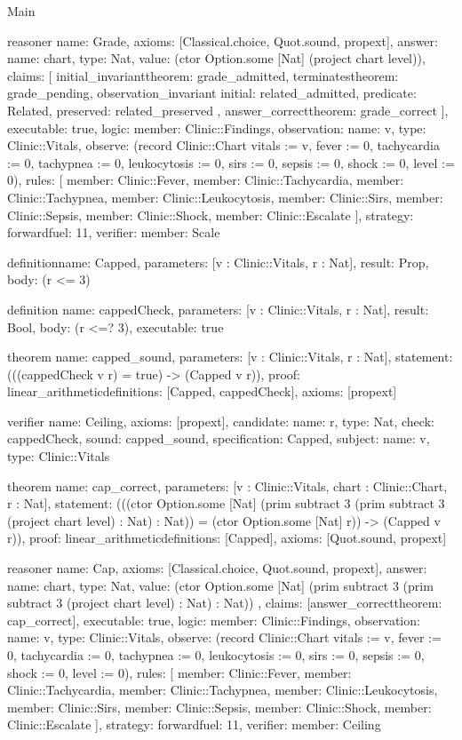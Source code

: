 \begin{lexlean}{Main}
\begin{semanticmodule}
reasoner{
  name: Grade,
  axioms: [Classical.choice, Quot.sound, propext],
  answer: {name: chart, type: Nat, value: (ctor Option.some [Nat] (project chart level))},
  claims: [
    initial_invariant{theorem: grade_admitted},
    terminates{theorem: grade_pending},
    observation_invariant{
      initial: related_admitted,
      predicate: Related,
      preserved: related_preserved
    },
    answer_correct{theorem: grade_correct}
  ],
  executable: true,
  logic: {member: Clinic::Findings},
  observation: {name: v, type: Clinic::Vitals},
  observe: (record Clinic::Chart {vitals := v, fever := 0, tachycardia := 0, tachypnea := 0, leukocytosis := 0, sirs := 0, sepsis := 0, shock := 0, level := 0}),
  rules: [
    {member: Clinic::Fever},
    {member: Clinic::Tachycardia},
    {member: Clinic::Tachypnea},
    {member: Clinic::Leukocytosis},
    {member: Clinic::Sirs},
    {member: Clinic::Sepsis},
    {member: Clinic::Shock},
    {member: Clinic::Escalate}
  ],
  strategy: forward{fuel: 11},
  verifier: {member: Scale}
}

definition{name: Capped, parameters: [v : Clinic::Vitals, r : Nat], result: Prop, body: (r <= 3)}

definition{
  name: cappedCheck,
  parameters: [v : Clinic::Vitals, r : Nat],
  result: Bool,
  body: (r <=? 3),
  executable: true
}

theorem{
  name: capped_sound,
  parameters: [v : Clinic::Vitals, r : Nat],
  statement: (((cappedCheck v r) = true) -> (Capped v r)),
  proof: linear_arithmetic{definitions: [Capped, cappedCheck]},
  axioms: [propext]
}

verifier{
  name: Ceiling,
  axioms: [propext],
  candidate: {name: r, type: Nat},
  check: cappedCheck,
  sound: capped_sound,
  specification: Capped,
  subject: {name: v, type: Clinic::Vitals}
}

theorem{
  name: cap_correct,
  parameters: [v : Clinic::Vitals, chart : Clinic::Chart, r : Nat],
  statement: (((ctor Option.some [Nat] (prim subtract 3 (prim subtract 3 (project chart level) : Nat) : Nat)) = (ctor Option.some [Nat] r)) -> (Capped v r)),
  proof: linear_arithmetic{definitions: [Capped]},
  axioms: [Quot.sound, propext]
}

reasoner{
  name: Cap,
  axioms: [Classical.choice, Quot.sound, propext],
  answer: {
    name: chart,
    type: Nat,
    value: (ctor Option.some [Nat] (prim subtract 3 (prim subtract 3 (project chart level) : Nat) : Nat))
  },
  claims: [answer_correct{theorem: cap_correct}],
  executable: true,
  logic: {member: Clinic::Findings},
  observation: {name: v, type: Clinic::Vitals},
  observe: (record Clinic::Chart {vitals := v, fever := 0, tachycardia := 0, tachypnea := 0, leukocytosis := 0, sirs := 0, sepsis := 0, shock := 0, level := 0}),
  rules: [
    {member: Clinic::Fever},
    {member: Clinic::Tachycardia},
    {member: Clinic::Tachypnea},
    {member: Clinic::Leukocytosis},
    {member: Clinic::Sirs},
    {member: Clinic::Sepsis},
    {member: Clinic::Shock},
    {member: Clinic::Escalate}
  ],
  strategy: forward{fuel: 11},
  verifier: {member: Ceiling}
}


\end{semanticmodule}
\end{lexlean}
